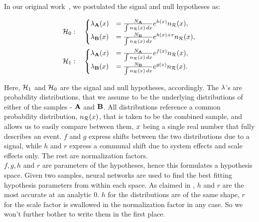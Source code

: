 \documentclass[paper/ddppaper2.tex]{subfiles}
\begin{document}
In our original work~\cite{LastDDPPaper}, we postulated the signal and null hypotheses as:

\begin{equation}
\label{eq:last_ddp_paper_hypotheses}
\begin{aligned}
    \nullhypothesis &: \quad
    \begin{cases}
        \pdf_{\dataset{A}}(\eventsymbol)
        &=
        \frac{N_{\dataset{A}}}
            {\int \refdist[\eventsymbol]\,d\eventsymbol}
        e^{h(\eventsymbol)} \refdist[\eventsymbol],
        \\
        \pdf_{\dataset{B}}(\eventsymbol)
        &=
        \frac{N_{\dataset{B}}}
            {\int \refdist[\eventsymbol]\,d\eventsymbol}
        e^{h(\eventsymbol)+r} \refdist[\eventsymbol],
    \end{cases} \\
    \hypothesis{1} &: \quad
    \begin{cases}
        \pdf_{\dataset{A}}(\eventsymbol)
        &=
        \frac{N_{\dataset{A}}}
            {\int \refdist[\eventsymbol]\,d\eventsymbol}
        e^{f(\eventsymbol)} \refdist[\eventsymbol],
        \\
        \pdf_{\dataset{B}}(\eventsymbol)
        &=
        \frac{N_{\dataset{B}}}
            {\int \refdist[\eventsymbol]\,d\eventsymbol}
        e^{g(\eventsymbol)} \refdist[\eventsymbol].
    \end{cases}
\end{aligned}
\end{equation}

\noindent Here, $\hypothesis{1}$ and $\nullhypothesis$ are the signal and null hypotheses, accordingly. The $\pdf$'s are probability distributions, that we assume to be the underlying distributions of either of the samples - $\dataset{A}$ and $\dataset{B}$. All distributions reference a common probability distribution, $\refdist[\eventsymbol]$, that is taken to be the combined sample, and allows us to easily compare between them, $\eventsymbol$ being a single real number that fully describes an event. $f$ and $g$ express shifts between the two distributions due to a signal, while $h$ and $r$ express a communal shift due to system effects and scale effects only. The rest are normalization factors.\\

$f, g, h$ and $r$ are parameters of the hypotheses, hence this formulates a hypothesis space. Given two samples, neural networks are used to find the best fitting hypothesis parameters from within each space. As claimed in \cite{LastDDPPaper}, $h$ and $r$ are the most accurate at an analytic 0. $h$ for the distributions are of the same shape, $r$ for the scale factor is swallowed in the normalization factor in any case. So we won't further bother to write them in the first place.
\end{document}
